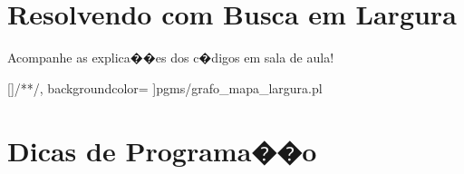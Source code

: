 \documentclass[final,a4paper]{article}
\begin{document}
\section{Resolvendo com  Busca em Largura}

 Acompanhe as explica��es dos c�digos em sala de aula!

[\color{blue}]{/*}{*/}, %
              backgroundcolor=\color{yellow}  %
		 ]{pgms/grafo_mapa_largura.pl}
		 


\section{Dicas de Programa��o}
\end{document}
